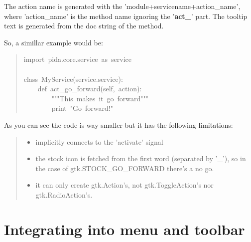 \documentclass[10pt,a4paper,english]{article}
\begin{document}
The action name is generated with the 'module+servicename+action{\_}name', where
'action{\_}name' is the method name ignoring the '{\color{red}\bfseries{}act{\_}}' part. The tooltip text is
generated from the doc string of the method.

So, a simillar example would be:
\begin{quote}{\ttfamily \raggedright \noindent
import~pida.core.service~as~service~\\
~\\
class~MyService(service.service):~\\
~~~~def~act{\_}go{\_}forward(self,~action):~\\
~~~~~~~~"{}"{}"This~makes~it~go~forward"{}"{}"~\\
~~~~~~~~print~"Go~forward!"
}\end{quote}

As you can see the code is way smaller but it has the following limitations:
\begin{quote}
\begin{itemize}
\item {} 
implicitly connects to the 'activate' signal

\item {} 
the stock icon is fetched from the first word (separated by '{\_}'), so in the
case of gtk.STOCK{\_}GO{\_}FORWARD there's a no go.

\item {} 
it can only create gtk.Action's, not gtk.ToggleAction's nor
gtk.RadioAction's.

\end{itemize}
\end{quote}



\hypertarget{integrating-into-menu-and-toolbar}{}
\section*{Integrating into menu and toolbar}
\end{document}
